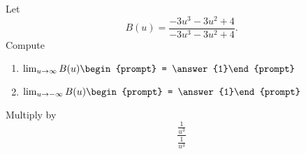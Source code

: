 \documentclass{ximera}
\author{Bart Snapp}
\begin{document}
\begin{exercise}
Let 
\[
B(u) = \frac{-3 u^3-3 u^2+4}{-3 u^3-3 u^2+4}.
\]
Compute
\begin{enumerate}
\item $\lim_{u\to \infty} B(u) \begin{prompt} = \answer{1}\end{prompt}$
\item $\lim_{u\to -\infty}B(u) \begin{prompt} = \answer{1}\end{prompt}$
\end{enumerate}
\begin{hint}
Multiply by
\[
\frac{\frac{1}{u^3}}{\frac{1}{u^3}}
\]
\end{hint}
\end{exercise}
\end{document}
